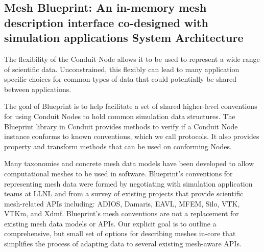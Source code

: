 \subsection{Mesh Blueprint: An in-memory mesh description interface co-designed with simulation applications
System Architecture}

The flexibility of the Conduit Node allows it to be used to represent a
wide range of scientific data.
%
Unconstrained, this flexibly can lead to
many application specific choices for common types of data that could
potentially be shared between applications.

The goal of Blueprint is to help facilitate a set of shared higher-level
conventions for using Conduit Nodes to hold common simulation data structures.
%
The Blueprint library in Conduit provides methods to verify if a Conduit
Node instance conforms to known conventions, which we call protocols.
%
It also provides property and transform methods that can be used on conforming Nodes.

Many taxonomies and concrete mesh data models have been developed to allow
computational meshes to be used in software.
%
Blueprint’s conventions for representing mesh data were formed by negotiating
with simulation application teams at LLNL and from a survey of existing
projects that provide scientific mesh-related APIs including: ADIOS, Damaris,
EAVL, MFEM, Silo, VTK, VTKm, and Xdmf.
%
Blueprint’s mesh conventions are not a replacement for existing mesh data
models or APIs.
%
Our explicit goal is to outline a comprehensive, but small set of options
for describing meshes in-core that simplifies the process of adapting data
to several existing mesh-aware APIs.

